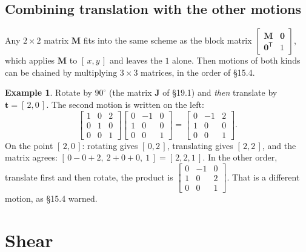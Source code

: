 \documentclass[11pt]{article}
\theoremstyle{plain}
\theoremstyle{definition}
\newtheorem{ex}{Example}[section]
\theoremstyle{remark}
\newcommand{\vc}[1]{\mathbf{#1}}
\newcommand{\mt}[1]{\mathbf{#1}}
\newcommand{\T}{^{\mathsf{T}}}
\begin{document}
\subsection{Combining translation with the other motions}
Any $2\times2$ matrix $\mt{M}$ fits into the same scheme as the block matrix
$\begin{bmatrix}\mt{M}&\vc{0}\\\vc{0}\T&1\end{bmatrix}$, which applies
$\mt{M}$ to $[\,x,y\,]$ and leaves the $1$ alone. Then motions of both kinds can
be chained by multiplying $3\times3$ matrices, in the order of \S15.4.

\begin{ex}
Rotate by $90^\circ$ (the matrix $\mt{J}$ of \S19.1) and \emph{then} translate
by $\vc{t}=[\,2,0\,]$. The second motion is written on the left:
\[
  \begin{bmatrix}1&0&2\\0&1&0\\0&0&1\end{bmatrix}
  \begin{bmatrix}0&-1&0\\1&0&0\\0&0&1\end{bmatrix}
  =
  \begin{bmatrix}0&-1&2\\1&0&0\\0&0&1\end{bmatrix}.
\]
On the point $[\,2,0\,]$: rotating gives $[\,0,2\,]$, translating gives
$[\,2,2\,]$, and the matrix agrees:
$[\,0-0+2,\ 2+0+0,\ 1\,]=[\,2,2,1\,]$. In the other order, translate first and
then rotate, the product is
$\begin{bmatrix}0&-1&0\\1&0&2\\0&0&1\end{bmatrix}$. That is a different motion,
as \S15.4 warned.
\end{ex}

\section{Shear}
\end{document}
